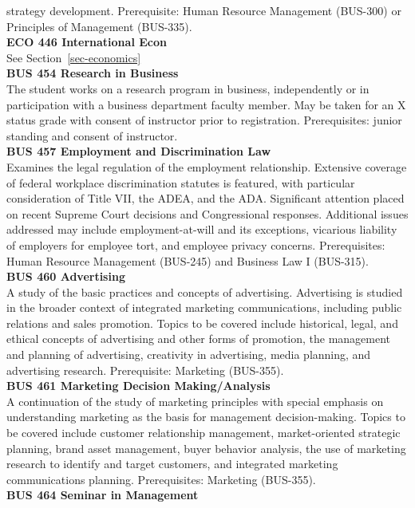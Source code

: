\documentclass[
  letterpaper,
]{scrbook}
\begin{document}
strategy development. Prerequisite: Human Resource Management (BUS-300)
or Principles of Management (BUS-335).\\
\textbf{ECO 446 International Econ}\\
See Section~\ref{sec-economics}\\
\textbf{BUS 454 Research in Business}\\
The student works on a research program in business, independently or in
participation with a business department faculty member. May be taken
for an X status grade with consent of instructor prior to registration.
Prerequisites: junior standing and consent of instructor.\\
\textbf{BUS 457 Employment and Discrimination Law}\\
Examines the legal regulation of the employment relationship. Extensive
coverage of federal workplace discrimination statutes is featured, with
particular consideration of Title VII, the ADEA, and the ADA.
Significant attention placed on recent Supreme Court decisions and
Congressional responses. Additional issues addressed may include
employment-at-will and its exceptions, vicarious liability of employers
for employee tort, and employee privacy concerns. Prerequisites: Human
Resource Management (BUS-245) and Business Law I (BUS-315).\\
\textbf{BUS 460 Advertising}\\
A study of the basic practices and concepts of advertising. Advertising
is studied in the broader context of integrated marketing
communications, including public relations and sales promotion. Topics
to be covered include historical, legal, and ethical concepts of
advertising and other forms of promotion, the management and planning of
advertising, creativity in advertising, media planning, and advertising
research. Prerequisite: Marketing (BUS-355).\\
\textbf{BUS 461 Marketing Decision Making/Analysis}\\
A continuation of the study of marketing principles with special
emphasis on understanding marketing as the basis for management
decision-making. Topics to be covered include customer relationship
management, market-oriented strategic planning, brand asset management,
buyer behavior analysis, the use of marketing research to identify and
target customers, and integrated marketing communications planning.
Prerequisites: Marketing (BUS-355).\\
\textbf{BUS 464 Seminar in Management}\\
\end{document}
